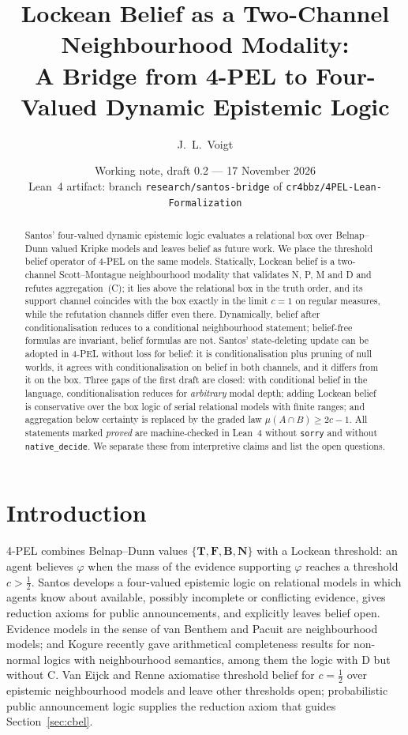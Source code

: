 \documentclass[11pt,a4paper]{article}
\title{Lockean Belief as a Two-Channel Neighbourhood Modality:\\
A Bridge from 4-PEL to Four-Valued Dynamic Epistemic Logic}
\author{J.~L.~Voigt}
\date{Working note, draft 0.2 --- 17 November 2026\\[2pt]
\normalsize Lean~4 artifact: branch \texttt{research/santos-bridge} of
\texttt{cr4bbz/4PEL-Lean-Formalization}}
\theoremstyle{definition}
\theoremstyle{remark}
\newcommand{\Tv}{\mathbf{T}}\newcommand{\Fv}{\mathbf{F}}
\newcommand{\Bv}{\mathbf{B}}\newcommand{\Nv}{\mathbf{N}}
\begin{document}
\maketitle

\begin{abstract}
\noindent Santos' four-valued dynamic epistemic logic evaluates a relational box over
Belnap--Dunn valued Kripke models and leaves belief as future work. We place the
threshold belief operator of 4-PEL on the same models. Statically, Lockean belief is a
two-channel Scott--Montague neighbourhood modality that validates N, P, M and D and
refutes aggregation~(C); it lies above the relational box in the truth order, and its
support channel coincides with the box exactly in the limit $c=1$ on regular measures,
while the refutation channels differ even there. Dynamically, belief after
conditionalisation reduces to a conditional neighbourhood statement; belief-free
formulas are invariant, belief formulas are not. Santos' state-deleting update can be
adopted in 4-PEL without loss for belief: it is conditionalisation plus pruning of null
worlds, it agrees with conditionalisation on belief in both channels, and it differs
from it on the box. Three gaps of the first draft are closed: with conditional belief
in the language, conditionalisation reduces for \emph{arbitrary} modal depth; adding
Lockean belief is conservative over the box logic of serial relational models with
finite ranges; and aggregation below certainty is replaced by the graded law
$\mu(A\cap B)\ge 2c-1$. All statements marked \emph{proved} are machine-checked in Lean~4
without \texttt{sorry} and without \texttt{native\_decide}. We separate these from
interpretive claims and list the open questions.
\end{abstract}

\section{Introduction}

4-PEL combines Belnap--Dunn values $\{\Tv,\Fv,\Bv,\Nv\}$ \cite{Belnap1977} with a
Lockean threshold: an agent believes $\varphi$ when the mass of the evidence supporting
$\varphi$ reaches a threshold $c>\tfrac12$. Santos \cite{Santos2020} develops a
four-valued epistemic logic on relational models in which agents know about available,
possibly incomplete or conflicting evidence, gives reduction axioms for public
announcements, and explicitly leaves belief open. Evidence models in the sense of van
Benthem and Pacuit \cite{vBP2011} are neighbourhood models; and Kogure \cite{Kogure2025}
recently gave arithmetical completeness results for non-normal logics with neighbourhood
semantics, among them the logic with D but without C. Van Eijck and Renne \cite{vER2014}
axiomatise threshold belief for $c=\tfrac12$ over epistemic neighbourhood models and leave
other thresholds open; probabilistic public announcement logic \cite{vBGK2006} supplies the
reduction axiom that guides Section~\ref{sec:cbel}.
\end{document}
